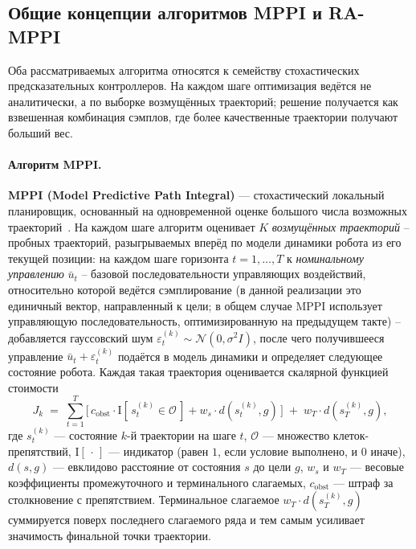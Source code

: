 \documentclass[a4paper,12pt]{extarticle}
\begin{document}
    \subsection{Общие концепции алгоритмов MPPI и RA-MPPI}

    Оба рассматриваемых алгоритма относятся к семейству стохастических предсказательных контроллеров. На каждом шаге оптимизация ведётся не аналитически, а по выборке возмущённых траекторий; решение получается как взвешенная комбинация сэмплов, где более качественные траектории получают больший вес.

    \paragraph{Алгоритм MPPI.}

    \textbf{MPPI (Model Predictive Path Integral)} --- стохастический локальный планировщик,
    основанный на одновременной оценке большого числа возможных траекторий~\cite{mppis, mppi}.
    На каждом шаге алгоритм оценивает $K$ \emph{возмущённых траекторий} --
    пробных траекторий, разыгрываемых вперёд по модели динамики робота из его текущей позиции:
    на каждом шаге горизонта $t = 1, \dots, T$ к \emph{номинальному управлению} $\bar{u}_t$ --
    базовой последовательности управляющих воздействий, относительно которой ведётся сэмплирование (в данной реализации это единичный вектор, направленный к цели; в общем случае MPPI использует управляющую последовательность, оптимизированную на предыдущем такте) --
    добавляется гауссовский шум $\varepsilon_t^{(k)} \sim \mathcal{N}(0,\sigma^2 I)$,
    после чего получившееся управление $\bar{u}_t + \varepsilon_t^{(k)}$ подаётся в модель динамики и определяет следующее состояние робота.
    Каждая такая траектория оценивается скалярной функцией стоимости
    $$
    J_k \;=\; \sum_{t=1}^{T} \Big[\, c_{\text{obst}} \cdot \mathrm{I}\!\left[\, s_t^{(k)} \in \mathcal{O}\, \right]
          + w_s \cdot d(s_t^{(k)}, g)\, \Big]
          \;+\; w_T \cdot d(s_T^{(k)}, g),
    $$
    где $s_t^{(k)}$ --- состояние $k$-й траектории на шаге $t$,
    $\mathcal{O}$ --- множество клеток-препятствий,
    $\mathrm{I}[\,\cdot\,]$ --- индикатор (равен $1$, если условие выполнено, и $0$ иначе),
    $d(s,g)$ --- евклидово расстояние от состояния $s$ до цели $g$,
    $w_s$ и $w_T$ --- весовые коэффициенты промежуточного и терминального слагаемых,
    $c_{\text{obst}}$ --- штраф за столкновение с препятствием.
    Терминальное слагаемое $w_T \cdot d(s_T^{(k)}, g)$ суммируется поверх
    последнего слагаемого ряда и тем самым усиливает значимость финальной точки траектории.
\end{document}
